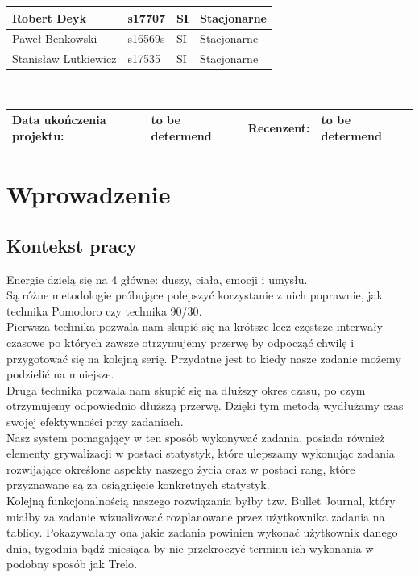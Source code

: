\documentclass[a4paper,11pt]{report}
\begin{document}
\begin{center}
\begin{tabular}{|l|l|l|l|}
\hline
Robert Deyk &s17707&SI&Stacjonarne \\
\hline
Paweł Benkowski&s16569s&SI&Stacjonarne\\
\hline
Stanisław Lutkiewicz&s17535&SI&Stacjonarne \\
\hline
\end{tabular}\\
\vspace{1cm}
\begin{tabular}{|l|l|l|l|}
\hline
\textbf{Data ukończenia projektu:} & to be determend & \textbf{Recenzent:} & to be determend\\
\hline
\end{tabular}
\end{center}
\tableofcontents

\chapter{Wprowadzenie}
\section{Kontekst pracy}
Energie dzielą się na 4 główne: duszy, ciała, emocji i umysłu\cite{Harward}.\\ Są różne metodologie próbujące polepszyć korzystanie z nich poprawnie, jak technika Pomodoro\cite{Pomodoro} czy technika 90/30\cite{90/30}. \\Pierwsza technika pozwala nam skupić się na krótsze lecz częstsze interwały czasowe po których zawsze otrzymujemy przerwę by odpocząć chwilę i przygotować się na kolejną serię. Przydatne jest to kiedy nasze zadanie możemy podzielić na mniejsze. \\Druga technika pozwala nam skupić się na dłuższy okres czasu, po czym otrzymujemy odpowiednio dłuższą przerwę. Dzięki tym metodą wydłużamy czas swojej efektywności przy zadaniach. \\Nasz system pomagający w ten sposób wykonywać zadania, posiada również elementy grywalizacji\cite{grywalizacja} w postaci statystyk, które ulepszamy wykonując zadania rozwijające określone aspekty naszego życia oraz w postaci rang\cite{rangi}, które przyznawane są za osiągnięcie konkretnych statystyk. \\Kolejną funkcjonalnością naszego rozwiązania byłby tzw. Bullet Journal, który miałby za zadanie wizualizować rozplanowane przez użytkownika zadania na tablicy. Pokazywałaby ona jakie zadania powinien wykonać użytkownik danego dnia, tygodnia bądź miesiąca by nie przekroczyć terminu ich wykonania w podobny sposób jak Trelo\cite{trelo}. 
\end{document}
